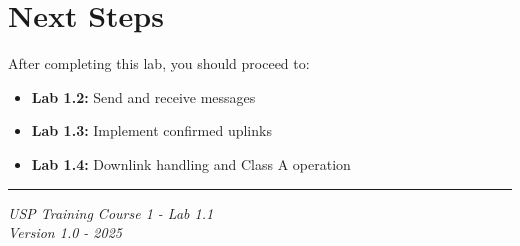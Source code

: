 \documentclass[11pt,a4paper]{article}
\begin{document}
\section{Next Steps}

After completing this lab, you should proceed to:
\begin{itemize}
    \item \textbf{Lab 1.2:} Send and receive messages
    \item \textbf{Lab 1.3:} Implement confirmed uplinks
    \item \textbf{Lab 1.4:} Downlink handling and Class A operation
\end{itemize}

\vfill

\noindent\rule{\textwidth}{0.4pt}
\begin{center}
\textit{USP Training Course 1 - Lab 1.1}\\
\textit{Version 1.0 - 2025}
\end{center}
\end{document}
